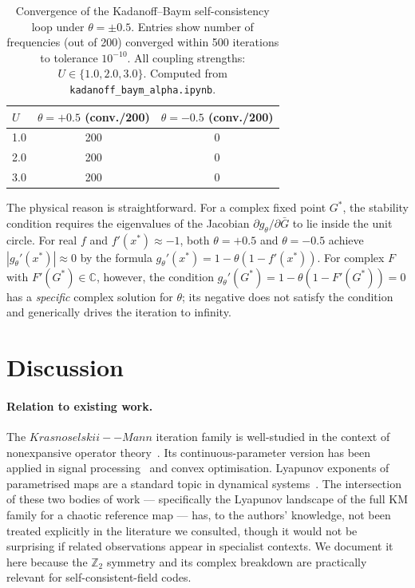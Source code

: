 \documentclass[aps,pre,twocolumn,superscriptaddress,nofootinbib,
               longbibliography,floatfix]{revtex4-2}
\newcommand{\KM}{Krasnoselskii--Mann}
\theoremstyle{plain}
\theoremstyle{remark}
\begin{document}
\begin{table}[tp]
  \centering
  \caption{%
    Convergence of the Kadanoff--Baym self-consistency loop
    under $\theta = \pm 0.5$.
    Entries show number of frequencies (out of 200) converged
    within 500 iterations to tolerance $10^{-10}$.
    All coupling strengths: $U \in \{1.0, 2.0, 3.0\}$.
    Computed from \texttt{kadanoff\_baym\_alpha.ipynb}.
  }
  \label{tab:complex}
  \begin{tabular}{@{}l S[table-format=3.0] S[table-format=3.0]@{}}
    \toprule
    $U$ & {$\theta = +0.5$ (conv./200)} & {$\theta = -0.5$ (conv./200)} \\
     & 200 & 0 \\
    2.0 & 200 & 0 \\
    3.0 & 200 & 0 \\
    \bottomrule
  \end{tabular}
\end{table}

The physical reason is straightforward.  For a complex fixed
point $G^*$, the stability condition requires the eigenvalues of
the Jacobian $\partial g_\theta / \partial \bar{G}$ to lie
inside the unit circle.  For real $f$ and $f'(x^*) \approx -1$,
both $\theta = +0.5$ and $\theta = -0.5$ achieve
$|g_\theta'(x^*)| \approx 0$ by the formula
$g_\theta'(x^*) = 1 - \theta(1 - f'(x^*))$.
For complex $F$ with $F'(G^*) \in \mathbb{C}$, however, the
condition $g_\theta'(G^*) = 1 - \theta(1 - F'(G^*)) = 0$ has a
\emph{specific} complex solution for $\theta$; its negative does
not satisfy the condition and generically drives the iteration
to infinity.

\section{Discussion}
\label{sec:discussion}

\paragraph{Relation to existing work.}
The $\KM$ iteration family is well-studied in the
context of nonexpansive operator theory~\cite{Berinde2007}.
Its continuous-parameter version has been applied in signal
processing~\cite{Combettes2005} and convex optimisation.
Lyapunov exponents of parametrised maps are a standard topic in
dynamical systems~\cite{Strogatz2015,OttGrebogiYorke1990}.
The intersection of these two bodies of work — specifically
the Lyapunov landscape of the full KM family for a chaotic
reference map — has, to the authors' knowledge, not been
treated explicitly in the literature we consulted, though
it would not be surprising if related observations appear in
specialist contexts.  We document it here because the
$\mathbb{Z}_2$ symmetry and its complex breakdown are
practically relevant for self-consistent-field codes.
\end{document}
